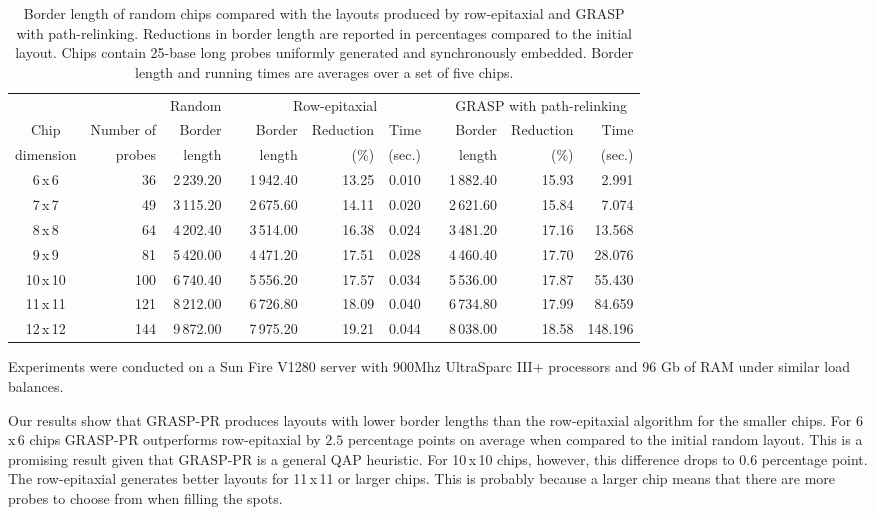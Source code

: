 \documentclass[english]{lni}
\begin{document}
\begin{table}[t]
\caption{Border length of random chips compared with the layouts produced by
row-epitaxial and GRASP with path-relinking. Reductions in border length are
reported in percentages compared to the initial layout. Chips contain 25-base
long probes uniformly generated and synchronously embedded. Border length and
running times are averages over a set of five chips.\label{tab:graspr_reptx}}
{\begin{tabular}{crrcrrrcrrr}
          &            & Random & & \multicolumn{3}{c}{Row-epitaxial}  & & \multicolumn{3}{c}{GRASP with path-relinking}  \\ \cline{3-3} \cline{5-7} \cline{9-11}
Chip      & Number of  & Border & & Border & Reduction & Time          & & Border & Reduction & Time   \\
dimension & probes     & length & & length & (\%)      & (sec.)        & & length & (\%)      & (sec.) \\

6\,x\,6   &  36 & 2\,239.20 & & 1\,942.40 & 13.25 & 0.010 & & 1\,882.40 & 15.93 & 2.991   \\
7\,x\,7   &  49 & 3\,115.20 & & 2\,675.60 & 14.11 & 0.020 & & 2\,621.60 & 15.84 & 7.074   \\
8\,x\,8   &  64 & 4\,202.40 & & 3\,514.00 & 16.38 & 0.024 & & 3\,481.20 & 17.16 & 13.568  \\
9\,x\,9   &  81 & 5\,420.00 & & 4\,471.20 & 17.51 & 0.028 & & 4\,460.40 & 17.70 & 28.076  \\
10\,x\,10 & 100 & 6\,740.40 & & 5\,556.20 & 17.57 & 0.034 & & 5\,536.00 & 17.87 & 55.430  \\
11\,x\,11 & 121 & 8\,212.00 & & 6\,726.80 & 18.09 & 0.040 & & 6\,734.80 & 17.99 & 84.659  \\
12\,x\,12 & 144 & 9\,872.00 & & 7\,975.20 & 19.21 & 0.044 & & 8\,038.00 & 18.58 & 148.196 \\
\end{tabular}}{Experiments were conducted on a Sun Fire V1280 server with 900Mhz
UltraSparc III+ processors and 96 Gb of RAM under similar load balances.}
\end{table}

Our results show that GRASP-PR produces layouts with lower border lengths than
the row-epitaxial algorithm for the smaller chips. For 6\,x\,6 chips GRASP-PR
outperforms row-epitaxial by $2.5$ percentage points on average when compared to
the initial random layout. This is a promising result given that GRASP-PR is a
general QAP heuristic. For 10\,x\,10 chips, however, this difference drops to
$0.6$ percentage point. The row-epitaxial generates better layouts for 11\,x\,11
or larger chips. This is probably because a larger chip means that there are
more probes to choose from when filling the spots.
\end{document}
